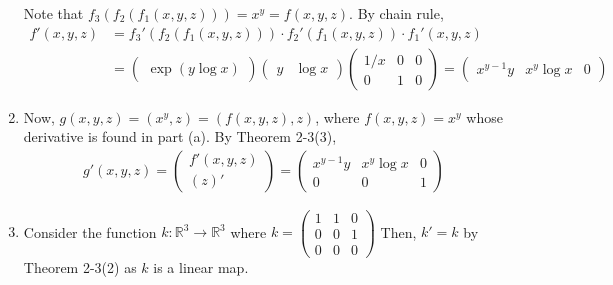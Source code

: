 \documentclass{exam}
\numberwithin{equation}{section}
\newcommand{\R}{\mathbb{R}}
\begin{document}
\begin{enumerate}[label=(\alph*)]
        Note that $f_3(f_2(f_1(x,y,z)))=x^y=f(x,y,z)$. By chain rule,
        \begin{align*}
            f'(x,y,z)&=f_3'(f_2(f_1(x,y,z)))\cdot f_2'(f_1(x,y,z))\cdot f_1'(x,y,z)\\
            &=\begin{pmatrix}
                \exp(y\log x)
            \end{pmatrix}\begin{pmatrix}
                y & \log x
            \end{pmatrix}\begin{pmatrix}
                1/x & 0 & 0\\
                0 & 1 & 0
            \end{pmatrix}=\begin{pmatrix}
                x^{y-1}y & x^y\log x & 0
            \end{pmatrix}
        \end{align*}
        \item Now, $g(x,y,z)=(x^y, z)=(f(x,y,z),z)$, where $f(x,y,z)=x^y$ whose derivative is found in part (a). By Theorem 2-3(3),
        \begin{align*}
            g'(x,y,z)=\begin{pmatrix}
                f'(x,y,z)\\
                (z)'
            \end{pmatrix}=\begin{pmatrix}
                x^{y-1}y & x^y\log x & 0\\
                0 & 0 & 1
            \end{pmatrix}
        \end{align*}
        \item Consider the function $k:\R^3\to\R^3$ where $
            k=\begin{pmatrix}
                1 & 1 & 0\\
                0 & 0 & 1\\
                0 & 0 & 0
            \end{pmatrix}$
            Then, $k'=k$ by Theorem 2-3(2) as $k$ is a linear map. 
            

\end{enumerate}
\end{document}
